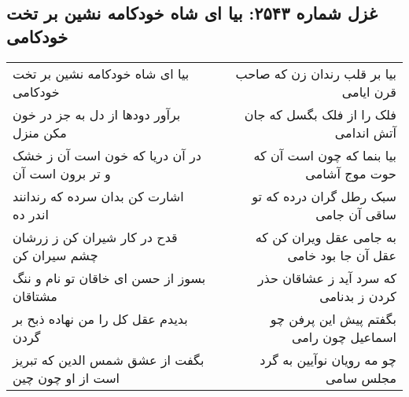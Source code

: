 \begin{center}
\section*{غزل شماره ۲۵۴۳: بیا ای شاه خودکامه نشین بر تخت خودکامی}
\label{sec:2543}
\begin{longtable}{l p{0.5cm} r}
بیا ای شاه خودکامه نشین بر تخت خودکامی
&&
بیا بر قلب رندان زن که صاحب قرن ایامی
\\
برآور دودها از دل به جز در خون مکن منزل
&&
فلک را از فلک بگسل که جان آتش اندامی
\\
در آن دریا که خون است آن ز خشک و تر برون است آن
&&
بیا بنما که چون است آن که حوت موج آشامی
\\
اشارت کن بدان سرده که رندانند اندر ده
&&
سبک رطل گران درده که تو ساقی آن جامی
\\
قدح در کار شیران کن ز زرشان چشم سیران کن
&&
به جامی عقل ویران کن که عقل آن جا بود خامی
\\
بسوز از حسن ای خاقان تو نام و ننگ مشتاقان
&&
که سرد آید ز عشاقان حذر کردن ز بدنامی
\\
بدیدم عقل کل را من نهاده ذبح بر گردن
&&
بگفتم پیش این پرفن چو اسماعیل چون رامی
\\
بگفت از عشق شمس الدین که تبریز است از او چون چین
&&
چو مه رویان نوآیین به گرد مجلس سامی
\\
\end{longtable}
\end{center}
